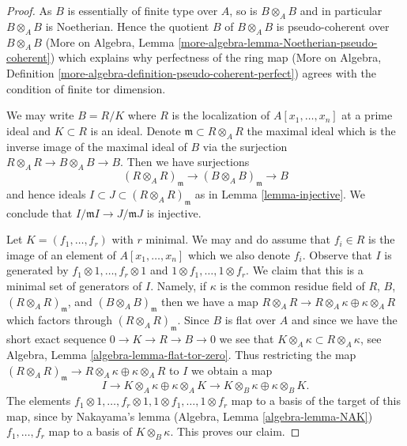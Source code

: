 \begin{proof}
As $B$ is essentially of finite type over $A$, so is $B \otimes_A B$ and
in particular $B \otimes_A B$ is Noetherian. Hence the quotient $B$ of
$B \otimes_A B$ is pseudo-coherent over $B \otimes_A B$
(More on Algebra, Lemma \ref{more-algebra-lemma-Noetherian-pseudo-coherent})
which explains why perfectness of the ring map (More on Algebra, Definition
\ref{more-algebra-definition-pseudo-coherent-perfect}) agrees with the
condition of finite tor dimension.

\medskip\noindent
We may write $B = R/K$ where $R$ is the localization of $A[x_1, \ldots, x_n]$
at a prime ideal and $K \subset R$ is an ideal. Denote
$\mathfrak m \subset R \otimes_A R$ the maximal ideal which is the inverse
image of the maximal ideal of $B$ via the surjection
$R \otimes_A R \to B \otimes_A B \to B$. Then we have surjections
$$
(R \otimes_A R)_\mathfrak m \to (B \otimes_A B)_\mathfrak m \to B
$$
and hence ideals $I \subset J \subset (R \otimes_A R)_\mathfrak m$
as in Lemma \ref{lemma-injective}. We conclude that
$I/\mathfrak m I \to J/\mathfrak m J$ is injective.

\medskip\noindent
Let $K = (f_1, \ldots, f_r)$ with $r$ minimal. We may and do assume that
$f_i \in R$ is the image of an element of $A[x_1, \ldots, x_n]$ which we
also denote $f_i$. Observe that $I$ is generated
by $f_1 \otimes 1, \ldots, f_r \otimes 1$ and
$1 \otimes f_1, \ldots, 1 \otimes f_r$. We claim that this is a minimal
set of generators of $I$. Namely, if $\kappa$ is the common residue field
of $R$, $B$, $(R \otimes_A R)_\mathfrak m$, and $(B \otimes_A B)_\mathfrak m$
then we have a map
$R \otimes_A R \to R \otimes_A \kappa \oplus \kappa \otimes_A R$
which factors through $(R \otimes_A R)_\mathfrak m$. Since $B$ is
flat over $A$ and since we have the short exact sequence
$0 \to K \to R \to B \to 0$ we see that
$K \otimes_A \kappa \subset R \otimes_A \kappa$, see
Algebra, Lemma \ref{algebra-lemma-flat-tor-zero}.
Thus restricting the map
$(R \otimes_A R)_\mathfrak m \to R \otimes_A \kappa \oplus \kappa \otimes_A R$
to $I$ we obtain a map
$$
I \to K \otimes_A \kappa \oplus \kappa \otimes_A K \to
K \otimes_B \kappa \oplus \kappa \otimes_B K.
$$
The elements
$f_1 \otimes 1, \ldots, f_r \otimes 1, 1 \otimes f_1, \ldots, 1 \otimes f_r$
map to a basis of the target of this map, since by Nakayama's lemma
(Algebra, Lemma \ref{algebra-lemma-NAK})
$f_1, \ldots, f_r$ map to a basis of $K \otimes_B \kappa$.
This proves our claim.


\end{proof}
